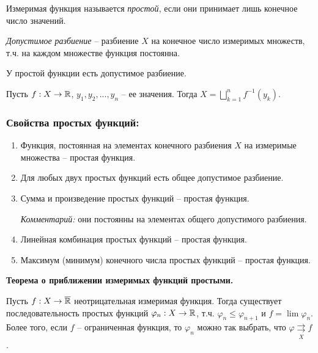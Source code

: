 \begin{definition}
    Измеримая функция называется \textit{простой}, если они принимает лишь 
    конечное число значений.
\end{definition}

\begin{definition}
    \textit{Допустимое разбиение} – разбиение $X$ на конечное число измеримых множеств,
    т.ч. на каждом множестве функция постоянна.
\end{definition}

\begin{remark}
    У простой функции есть допустимое разбиение.

    Пусть $f:X\rightarrow \mathbb{R}$, $y_1, y_2, ..., y_n$ – ее значения. 
    Тогда $X=\bigsqcup\limits_{k=1}^n f^{-1}(y_k)$.
\end{remark}

\subsubsection*{Свойства простых функций:}

\begin{enumerate}
    \item Функция, постоянная на элементах конечного разбиения $X$ на 
    измеримые множества – простая функция.

    \item Для любых двух простых функций есть общее допустимое разбиение.
    
    \item Сумма и произведение простых функций – простая функция.
    
    \textit{Комментарий:} они постоянны на элементах общего допустимого разбиения.
    \item Линейная комбинация простых функций – простая функция.
    \item Максимум (минимум) конечного числа простых функций – простая функция.
\end{enumerate}

\begin{theorem}
    \textbf{Теорема о приближении измеримых функций простыми.}

    Пусть $f:X\rightarrow \overline{\mathbb{R}}$ неотрицательная измеримая функция. Тогда 
    существует последовательность простых функций $\varphi_n: X\rightarrow \mathbb{R}$, т.ч. 
    $\varphi_n\leq \varphi_{n+1}$ и $f=\lim \varphi_n$. Более того, если $f$ – ограниченная 
    функция, то $\varphi_n$ можно так выбрать, что $\varphi\underset{X}{\rightrightarrows} f$.
\end{theorem}

